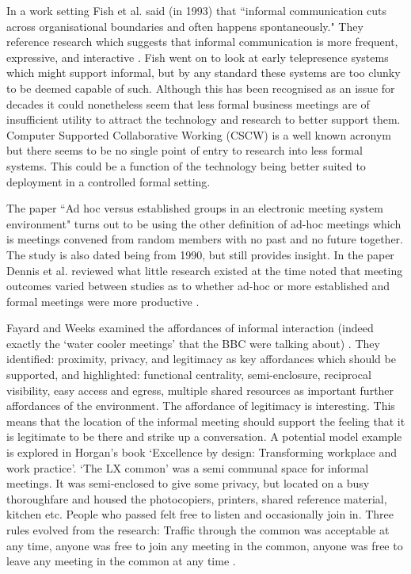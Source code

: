 In a work setting Fish et al. said (in 1993) that ``informal communication cuts across organisational boundaries and often happens spontaneously." They reference research which suggests that informal communication is more frequent, expressive, and interactive \cite{Fish1993}. Fish went on to look at early telepresence systems which might support informal, but by any standard these systems are too clunky to be deemed capable of such. Although this has been recognised as an issue for decades it could nonetheless seem that less formal business meetings are of insufficient utility to attract the technology and research to better support them. Computer Supported Collaborative Working (CSCW) is a well known acronym  but there seems to be no single point of entry to research into less formal systems. This could be a function of the technology being better suited to deployment in a controlled formal setting. \par
The paper ``Ad hoc versus established groups in an electronic meeting system environment" turns out to be using the other definition of ad-hoc meetings which is meetings convened from random members with no past and no future together. The study is also dated being from 1990, but still provides insight. In the paper Dennis et al. reviewed what little research existed at the time noted that meeting outcomes varied between studies as to whether ad-hoc or more established and formal meetings were more productive \cite{Dennis1990}.\par
            Fayard and Weeks examined the affordances of informal interaction (indeed exactly the `water cooler meetings' that the BBC were talking about) \cite{Fayard2007}. They identified: proximity, privacy, and legitimacy as key affordances which should be supported, and highlighted: functional centrality, semi-enclosure, reciprocal visibility, easy access and egress, multiple shared resources as important further affordances of the environment. The affordance of legitimacy is interesting. This means that the location of the informal meeting should support the feeling that it is legitimate to be there and strike up a conversation. 
            A potential model example is explored in Horgan's book `Excellence by design: Transforming workplace and work practice'. `The LX common' was a semi communal space for informal meetings. It was semi-enclosed to give some privacy, but located on a busy thoroughfare and housed the photocopiers, printers, shared reference material, kitchen etc.  People who passed felt free to listen and occasionally join in. Three rules evolved from the research: Traffic through the common was acceptable at any time, anyone was free to join any meeting in the common, anyone was free to leave any meeting in the common at any time \cite{horgen1999excellence}.\par

